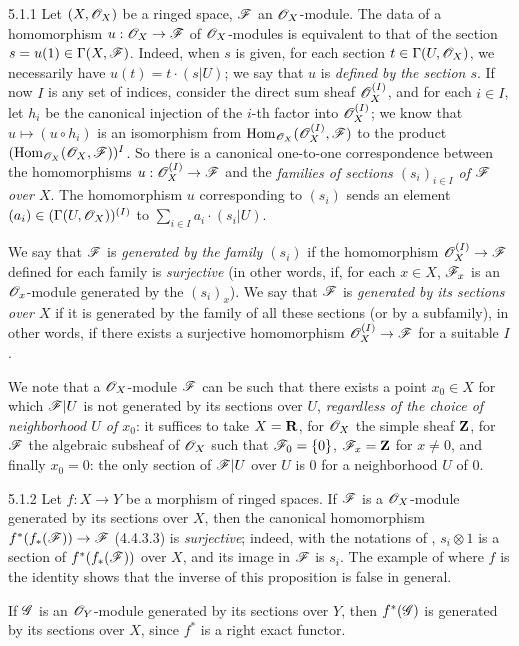 \begin{env}{5.1.1}
\label{env-0.5.1.1}
Let $(X,\mathscr{O}_X)$ be a ringed space, $\mathscr{F}$ an $\mathscr{O}_X$-module. The data of a homomorphism
$u:\mathscr{O}_X\to\mathscr{F}$ of $\mathscr{O}_X$-modules is equivalent to that of the section
$s=u(1)\in\Gamma(X,\mathscr{F})$. Indeed, when $s$ is given, for each section
$t\in\Gamma(U,\mathscr{O}_X)$, we necessarily have $u(t)=t\cdot(s|U)$; we say that $u$ is
\emph{defined by the section $s$}. If now $I$ is any set of indices, consider the direct
sum sheaf $\mathscr{O}_X^{(I)}$, and for each $i\in I$, let $h_i$ be the canonical injection of
the $i$-th factor into $\mathscr{O}_X^{(I)}$; we know that $u\mapsto(u\circ h_i)$ is an isomorphism
from ${\mathop{\mathrm{Hom}}\nolimits}_{\mathscr{O}_X}(\mathscr{O}_X^{(I)},\mathscr{F})$ to the product $({\mathop{\mathrm{Hom}}\nolimits}_{\mathscr{O}_X}(\mathscr{O}_X,\mathscr{F}))^I$. So
there is a canonical one-to-one correspondence between the homomorphisms
$u:\mathscr{O}_X^{(I)}\to\mathscr{F}$ and the \emph{families of sections $(s_i)_{i\in I}$ of $\mathscr{F}$ over
$X$}. The homomorphism $u$ corresponding to $(s_i)$ sends an element
$(a_i)\in(\Gamma(U,\mathscr{O}_X))^{(I)}$ to $\sum_{i\in I}a_i\cdot(s_i|U)$.

We say that $\mathscr{F}$ is \emph{generated by the family $(s_i)$} if the homomorphism
$\mathscr{O}_X^{(I)}\to\mathscr{F}$ defined
for each family is \emph{surjective} (in other words, if, for each $x\in X$, $\mathscr{F}_x$ is an
$\mathscr{O}_x$-module generated by the $(s_i)_x$). We say that $\mathscr{F}$ is \emph{generated by its
sections over $X$} if it is generated by the family of all these sections (or by a
subfamily), in other words, if there exists a surjective homomorphism $\mathscr{O}_X^{(I)}\to\mathscr{F}$
for a suitable $I$.

We note that a $\mathscr{O}_X$-module $\mathscr{F}$ can be such that there exists a point $x_0\in X$ for
which $\mathscr{F}|U$ is not generated by its sections over $U$, \emph{regardless of the choice
of neighborhood $U$ of $x_0$}: it suffices to take $X=\mathbf{R}$, for $\mathscr{O}_X$ the simple sheaf
$\mathbf{Z}$, for $\mathscr{F}$ the algebraic subsheaf of $\mathscr{O}_X$ such that $\mathscr{F}_0=\{0\}$,
$\mathscr{F}_x=\mathbf{Z}$ for $x\neq 0$, and finally $x_0=0$: the only section of $\mathscr{F}|U$ over $U$ 
is $0$ for a neighborhood $U$ of $0$.
\end{env}

\begin{env}{5.1.2}
\label{env-0.5.1.2}
Let $f:X\to Y$ be a morphism of ringed spaces. If $\mathscr{F}$ is a $\mathscr{O}_X$-module generated by
its sections over $X$, then the canonical homomorphism $f^*(f_*(\mathscr{F}))\to\mathscr{F}$ (4.4.3.3)
is \emph{surjective}; indeed, with the notations of , $s_i\otimes 1$ is a
section of $f^*(f_*(\mathscr{F}))$ over $X$, and its image in $\mathscr{F}$ is $s_i$. The example of
 where $f$ is the identity shows that the inverse of this proposition is
false in general.

If $\mathscr{G}$ is an $\mathscr{O}_Y$-module generated by its sections over $Y$, then $f^*(\mathscr{G})$ is
generated by its sections over $X$, since $f^*$ is a right exact functor.
\end{env}

